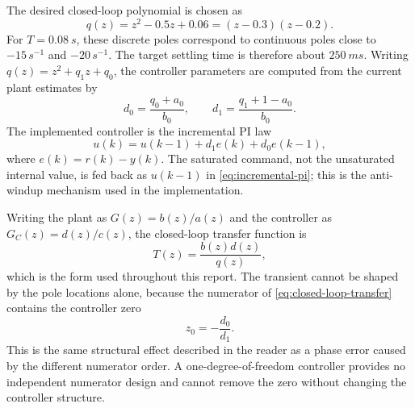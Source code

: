 The desired closed-loop polynomial is chosen as
\begin{equation}
  q(z)=z^2-0.5z+0.06=(z-0.3)(z-0.2).
  \label{eq:desired-polynomial}
\end{equation}
For \(T=\SI{0.08}{s}\), these discrete poles correspond to continuous poles
close to \(-15\,\si{s^{-1}}\) and \(-20\,\si{s^{-1}}\). The target settling
time is therefore about \(\SI{250}{ms}\). Writing \(q(z)=z^2+q_1z+q_0\), the
controller parameters are computed from the current plant estimates by
\begin{equation}
  d_0=\frac{q_0+a_0}{b_0},
  \qquad
  d_1=\frac{q_1+1-a_0}{b_0}.
  \label{eq:pole-placement-parameters}
\end{equation}
The implemented controller is the incremental PI law
\begin{equation}
  u(k)=u(k-1)+d_1e(k)+d_0e(k-1),
  \label{eq:incremental-pi}
\end{equation}
where \(e(k)=r(k)-y(k)\). The saturated command, not the unsaturated internal
value, is fed back as \(u(k-1)\) in \eqref{eq:incremental-pi}; this is the
anti-windup mechanism used in the implementation.

Writing the plant as \(G(z)=b(z)/a(z)\) and the controller as
\(G_C(z)=d(z)/c(z)\), the closed-loop transfer function is
\begin{equation}
  T(z)=\frac{b(z)d(z)}{q(z)} ,
  \label{eq:closed-loop-transfer}
\end{equation}
which is the form used throughout this report. The transient cannot be shaped
by the pole locations alone, because the numerator of
\eqref{eq:closed-loop-transfer} contains the controller zero
\begin{equation}
  z_0=-\frac{d_0}{d_1}.
  \label{eq:controller-zero}
\end{equation}
This is the same structural effect described in the reader as a phase error
caused by the different numerator order. A one-degree-of-freedom controller
provides no independent numerator design and cannot remove the zero without
changing the controller structure.
